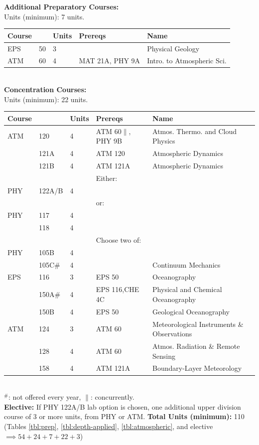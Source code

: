 \documentclass[12pt]{article}
\begin{document}
\newpage
{}
\vskip 0.25cm
\noindent
{\bf Additional Preparatory Courses:  }\\
Units (minimum): 7 units.\\
\begin{tabular}{|lllll|}
\hline
Course & & Units & Prereqs & Name \\
\hline
EPS & 50     & 3 & & Physical Geology \\
ATM & 60  & 4 & MAT 21A, PHY 9A & Intro. to Atmospheric Sci. \\
\hline
\end{tabular}\\
\vskip 0.25cm
\noindent
{\bf Concentration Courses:  }\\
Units (minimum):  22 units.\\
\begin{tabular}{|lllll|}
\hline
Course & & Units & Prereqs & Name \\
\hline
ATM & 120    & 4 & ATM 60$\parallel$, PHY 9B   & Atmos. Thermo. and Cloud Physics \\
    & 121A   & 4 & ATM 120  & Atmospheric Dynamics \\
    & 121B   & 4 & ATM 121A & Atmospheric Dynamics \\
\hline
\hline
    & & & Either: & \\
PHY & 122A/B & 4 & & \\
\hline
    & & & or: & \\
PHY & 117   & 4 & & \\
    & 118   & 4 & & \\
\hline
\hline
    & & & Choose two of: & \\
PHY & 105B   & 4 & & \\
    & 105C$\#$  & 4 &           & Continuum Mechanics\\
EPS & 116   & 3 & EPS 50       & Oceanography\\
    & 150A$\#$  & 4 & EPS 116,CHE 4C & Physical and Chemical Oceanography\\
    & 150B      & 4 & EPS 50       & Geological Oceanography\\
ATM & 124       & 3 & ATM 60       & Meteorological Instruments \& Observations \\
    & 128       & 4 & ATM 60       & Atmos. Radiation \& Remote Sensing \\
    & 158       & 4 & ATM 121A     & Boundary-Layer Meteorology \\
\hline
\hline
\end{tabular}\\
\noindent
$^\#$: not offered every year, $\parallel$: concurrently.\\[4pt]
{\bf Elective: } If PHY 122A/B lab option is chosen, one additional upper division course of 3 or more units, from PHY or ATM.
{\bf Total Units (minimum):} 110\\
(Tables \ref{tbl:prep}, \ref{tbl:depth-applied}, \ref{tbl:atmospheric}, and elective $\implies 54+24+7+22+3$) \\
\end{document}

